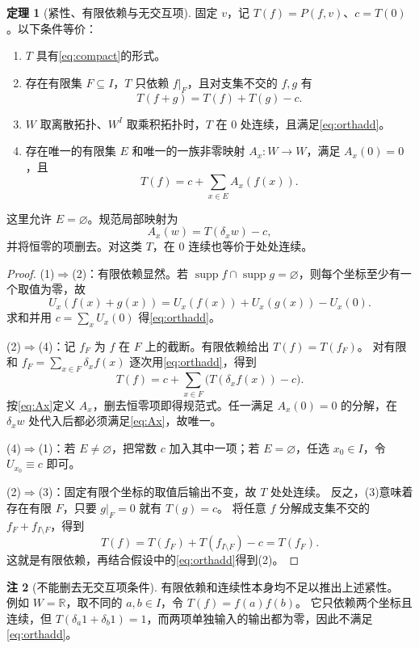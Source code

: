\documentclass[UTF8,11pt,a4paper]{ctexart}
\theoremstyle{definition}
\newtheorem{theorem}{定理}[section]
\newtheorem{remark}[theorem]{注}
\newcommand{\R}{\mathbb R}
\newcommand{\supp}{\operatorname{supp}}
\begin{document}
\begin{theorem}[紧性、有限依赖与无交互项]\label{thm:compact}
固定 $v$，记 $T(f)=P(f,v)$、$c=T(0)$。以下条件等价：
\begin{enumerate}
\item $T$ 具有\eqref{eq:compact}的形式。
\item 存在有限集 $F\subseteq I$，$T$ 只依赖 $f|_F$，且对支集不交的 $f,g$ 有
\begin{equation}\label{eq:orthadd}
 T(f+g)=T(f)+T(g)-c.
\end{equation}
\item $W$ 取离散拓扑、$W^I$ 取乘积拓扑时，$T$ 在 $0$ 处连续，且满足\eqref{eq:orthadd}。
\item 存在唯一的有限集 $E$ 和唯一的一族非零映射 $A_x:W\to W$，满足 $A_x(0)=0$，且
\begin{equation}\label{eq:canonical}
 T(f)=c+\sum_{x\in E}A_x(f(x)).
\end{equation}
\end{enumerate}
这里允许 $E=\varnothing$。规范局部映射为
\begin{equation}\label{eq:Ax}
 A_x(w)=T(\delta_xw)-c,
\end{equation}
并将恒零的项删去。对这类 $T$，在 $0$ 连续也等价于处处连续。
\end{theorem}
\begin{proof}
(1)$\Rightarrow$(2)：有限依赖显然。若 $\supp f\cap\supp g=\varnothing$，则每个坐标至少有一个取值为零，故
\[
 U_x(f(x)+g(x))=U_x(f(x))+U_x(g(x))-U_x(0).
\]
求和并用 $c=\sum_xU_x(0)$ 得\eqref{eq:orthadd}。

(2)$\Rightarrow$(4)：记 $f_F$ 为 $f$ 在 $F$ 上的截断。有限依赖给出 $T(f)=T(f_F)$。
对有限和 $f_F=\sum_{x\in F}\delta_xf(x)$ 逐次用\eqref{eq:orthadd}，得到
\[
 T(f)=c+\sum_{x\in F}\bigl(T(\delta_xf(x))-c\bigr).
\]
按\eqref{eq:Ax}定义 $A_x$，删去恒零项即得规范式。任一满足 $A_x(0)=0$ 的分解，在 $\delta_xw$ 处代入后都必须满足\eqref{eq:Ax}，故唯一。

(4)$\Rightarrow$(1)：若 $E\ne\varnothing$，把常数 $c$ 加入其中一项；若 $E=\varnothing$，任选 $x_0\in I$，令 $U_{x_0}\equiv c$ 即可。

(2)$\Rightarrow$(3)：固定有限个坐标的取值后输出不变，故 $T$ 处处连续。
反之，(3)意味着存在有限 $F$，只要 $g|_F=0$ 就有 $T(g)=c$。
将任意 $f$ 分解成支集不交的 $f_F+f_{I\setminus F}$，得到
\[
 T(f)=T(f_F)+T(f_{I\setminus F})-c=T(f_F).
\]
这就是有限依赖，再结合假设中的\eqref{eq:orthadd}得到(2)。
\end{proof}

\begin{remark}[不能删去无交互项条件]
有限依赖和连续性本身均不足以推出上述紧性。
例如 $W=\R$，取不同的 $a,b\in I$，令 $T(f)=f(a)f(b)$。
它只依赖两个坐标且连续，但
$T(\delta_a1+\delta_b1)=1$，而两项单独输入的输出都为零，因此不满足\eqref{eq:orthadd}。
\end{remark}
\end{document}
